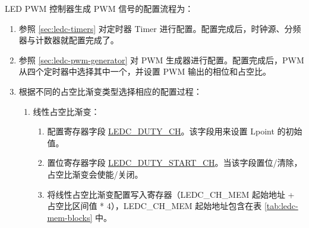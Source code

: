 \documentclass[main\_\_CN.tex]{subfiles}
\begin{document}
LED PWM 控制器生成 PWM 信号的配置流程为：
\begin{enumerate}
    \item 参照 \ref{sec:ledc-timers} 对定时器 Timer 进行配置。配置完成后，时钟源、分频器与计数器就配置完成了。
    \item 参照 \ref{sec:ledc-pwm-generator} 对 PWM 生成器进行配置。配置完成后，PWM 从四个定时器中选择其中一个，并设置 PWM 输出的相位和占空比。
    \item 根据不同的占空比渐变类型选择相应的配置过程：
    \begin{enumerate}
    \item 线性占空比渐变：
    \begin{enumerate}
    \item 配置寄存器字段 \hyperref[fielddesc:LEDCDUTYCHN]{LEDC\_DUTY\_CH}。该字段用来设置 Lpoint 的初始值。
    \item 置位寄存器字段 \hyperref[fielddesc:LEDCDUTYSTARTCHN]{LEDC\_DUTY\_START\_CH}。当该字段置位/清除，占空比渐变会使能/关闭。
    \item 将线性占空比渐变配置写入寄存器（LEDC\_CH\_MEM 起始地址 + 占空比区间值 * 4），LEDC\_CH\_MEM 起始地址包含在表 \ref{tab:ledc-mem-blocks} 中。


\end{enumerate}
\end{enumerate}
\end{enumerate}
\end{document}
